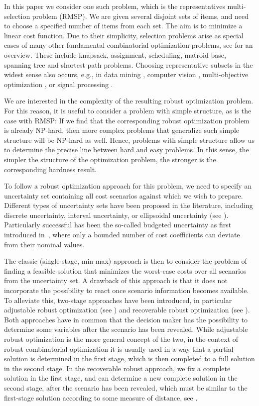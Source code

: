\documentclass[a4paper,11pt,abstracton]{scrartcl}
\theoremstyle{definition}
\theoremstyle{remark}
\begin{document}
In this paper we consider one such problem, which is the representatives multi-selection problem (RMSP). We are given several disjoint sets of items, and need to choose a specified number of items from each set. The aim is to minimize a linear cost function. Due to their simplicity, selection problems arise as special cases of many other fundamental combinatorial optimization problems, see \cite{kasperski2013approximating} for an overview. These include knapsack, assignment, scheduling, matroid base, spanning tree and shortest path problems. Choosing representative subsets in the widest sense also occurs, e.g., in data mining \cite{daszykowski2002representative,wang2017representative}, computer vision \cite{meng2016keyframes}, multi-objective optimization \cite{zio2011clustering}, or signal processing \cite{wang2015novel}.

We are interested in the complexity of the resulting robust optimization problem. For this reason, it is useful to consider a problem with simple structure, as is the case with RMSP: If we find that the corresponding robust optimization problem is already NP-hard, then more complex problems that generalize such simple structure will be NP-hard as well. Hence, problems with simple structure allow us to determine the precise line between hard and easy problems. In this sense, the simpler the structure of the optimization problem, the stronger is the corresponding hardness result.

To follow a robust optimization approach for this problem, we need to specify an uncertainty set containing all cost scenarios against which we wish to prepare. Different types of uncertainty sets have been proposed in the literature, including discrete uncertainty, interval uncertainty, or ellipsoidal uncertainty (see \cite{goerigk2016algorithm}). Particularly successful has been the so-called budgeted uncertainty as first introduced in~\cite{bertsimas2003robust}, where only a bounded number of cost coefficients can deviate from their nominal values. 

The classic (single-stage, min-max) approach is then to consider the problem of finding a feasible solution that minimizes the worst-case costs over all scenarios from the uncertainty set.
A drawback of this approach is that it does not incorporate the possibility to react once scenario information becomes available. To alleviate this, two-stage approaches have been introduced, in particular adjustable robust optimization (see \cite{yanikouglu2019survey}) and recoverable robust optimization (see \cite{liebchen2009concept}). Both approaches have in common that the decision maker has the possibility to determine some variables after the scenario has been revealed. While adjustable robust optimization is the more general concept of the two, in the context of robust combinatorial optimization it is usually used in a way that a partial solution is determined in the first stage, which is then completed to a full solution in the second stage. In the recoverable robust approach, we fix a complete solution in the first stage, and can determine a new complete solution in the second stage, after the scenario has been revealed, which must be similar to the first-stage solution according to some measure of distance, see \cite{kasperski2016robust}.
\end{document}
